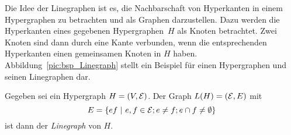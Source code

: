 Die Idee der Linegraphen ist es, die Nachbarschaft von Hyperkanten in einem Hypergraphen zu betrachten und als Graphen darzustellen. Dazu werden die Hyperkanten eines gegebenen Hypergraphen~$H$ als Knoten betrachtet. Zwei Knoten sind dann durch eine Kante verbunden, wenn die entsprechenden Hyperkanten einen gemeinsamen Knoten in $H$ haben. Abbildung~\ref{pic:bsp_Linegraph} stellt ein Beispiel für einen Hypergraphen und seinen Linegraphen dar.

\begin{mydef}\label{def:Linegraph}
    Gegeben sei ein Hypergraph $H=(V,\mathcal{E})$. Der Graph $L(H)=(\mathcal{E},E)$ mit $$E=\{ef\ |\ e,f\in\mathcal{E} ; e\neq f ; e\cap f\neq\emptyset\}$$ ist dann der \emph{Linegraph} von $H$.
\end{mydef}

